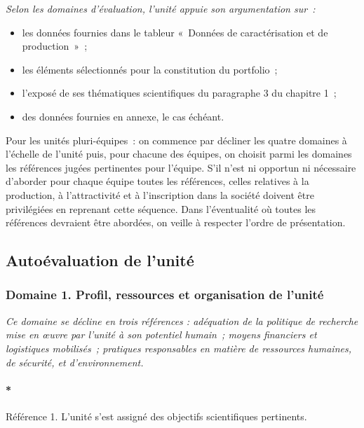 \documentclass[]{article}
\let\oldparagraph\paragraph
\renewcommand{\paragraph}[1]{\oldparagraph{#1}\mbox{}}
\newcommand{\instructions}[1]{{\em \color{hceresgreen}#1}}
\begin{document}
\instructions{Selon les domaines d’évaluation, l’unité appuie son argumentation sur :
\begin{itemize}
\item les données fournies dans le tableur « Données de caractérisation et de production » ;
\item les éléments sélectionnés pour la constitution du portfolio ;
\item l’exposé de ses thématiques scientifiques du paragraphe 3 du chapitre 1 ;
\item des données fournies en annexe, le cas échéant.
\end{itemize}

Pour les unités pluri-équipes : on commence par décliner les quatre domaines à l’échelle de l’unité puis, pour chacune des équipes, on choisit parmi les domaines les références jugées pertinentes pour l’équipe. S’il n’est ni opportun ni nécessaire d’aborder pour chaque équipe toutes les références, celles relatives à la production, à l’attractivité et à l’inscription dans la société doivent être privilégiées en reprenant cette séquence.
Dans l’éventualité où toutes les références devraient être abordées, on veille à respecter l’ordre de présentation.
}

\subsection{Autoévaluation de l'unité}

\subsubsection*{Domaine 1. Profil, ressources et organisation de
l'unité}

\instructions{Ce domaine se décline en trois références : adéquation de la politique de recherche mise en œuvre par l’unité à son potentiel humain ; moyens financiers et logistiques mobilisés ; pratiques responsables en matière de ressources humaines, de sécurité, et d’environnement.}

\paragraph*{Référence 1. L'unité s'est assigné des objectifs
scientifiques pertinents.}
\end{document}
